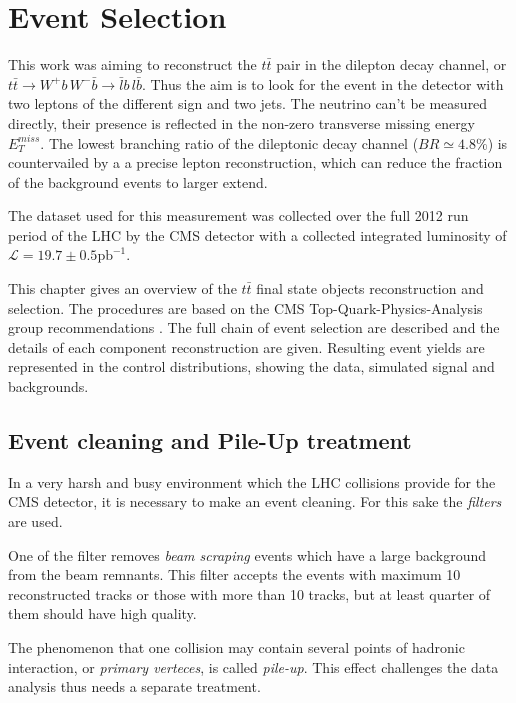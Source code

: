 \chapter{Event Selection}\label{chapt:event_selection}
 
This work was aiming to reconstruct the $t\bar{t}$ pair in the dilepton decay channel, or
$t\bar{t} \to W^{+}b\,W^{-}\bar{b} \to \bar{l}b\,l\bar{b}$. Thus the aim is to 
look for the event in the detector with two leptons of the different sign and two jets. The 
neutrino can't be measured directly, their presence is reflected in the non-zero transverse
missing energy $E_{T}^{miss}$. The lowest branching ratio of the dileptonic decay channel
($BR \simeq 4.8\%$) is countervailed by a a precise lepton reconstruction, which can reduce
the fraction of the background events to larger extend.

The dataset used for this measurement was collected over the full 2012 run period of the LHC
by the CMS detector with a collected integrated luminosity of $\mathcal{L} = 19.7 \pm 0.5 \textrm{pb}^{-1}$.

This chapter gives an overview of the $t\bar{t}$ final state objects reconstruction and selection. The 
procedures are based on the CMS Top-Quark-Physics-Analysis group recommendations \cite{TopPAGreco}.
The full chain of event selection are described and the details of each component reconstruction are given. 
Resulting event yields are represented in the control distributions, showing the data, simulated signal and backgrounds.

\section{Event cleaning and Pile-Up treatment}

In a very harsh and busy environment which the LHC collisions provide for the CMS detector, it is necessary to make an event 
cleaning. For this sake the \textit{filters} are used.

One of the filter removes \textit{beam scraping} events which have a large background from the beam remnants. This filter accepts 
the events with maximum 10 reconstructed tracks or those with more than 10 tracks, but at least quarter of them should have
high quality.

The phenomenon that one collision may contain several points of hadronic interaction, or \textit{primary verteces}, is called \textit{pile-up}. 
This effect challenges the data analysis thus needs a separate treatment. 

